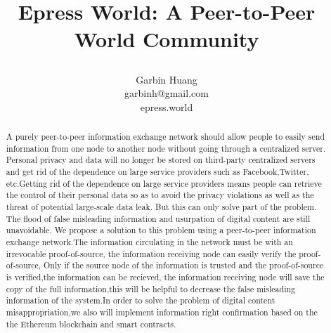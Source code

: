 \documentclass{article}
\title{ \begin{huge}
\textbf{Epress World: A Peer-to-Peer World Community} 
\end{huge} }
\author{ Garbin Huang \\ garbinh@gmail.com \\ epress.world }
\begin{document}
\maketitle
\begin{abstract}
 A purely peer-to-peer information exchange network should allow people to easily send information from one node to another node without going through a centralized server. Personal privacy and data will no longer be  stored on third-party centralized servers and get rid of the dependence on large service providers such as Facebook,Twitter, etc.Getting rid of the dependence on large service providers means people can retrieve the control of their personal data so as to avoid the privacy violations as well as  the threat of potential large-scale data leak. But this can only solve part of the problem. The flood of false misleading 
information and usurpation of digital content are still unavoidable. We propose a solution to this problem using a peer-to-peer information exchange network.The information circulating in the network must be with  an irrevocable proof-of-source, the information receiving node can easily verify the proof-of-source,  Only if the source node of the information is trusted and the proof-of-source is verified,the information can be recieved, the information receiving node will save the copy of the full information,this will be helpful to decrease the false misleading information of the system.In order to solve the problem of digital content misappropriation,we also will implement information right confirmation based on the  the Ethereum blockchain and smart contracts.
\end{abstract}
\end{document}
